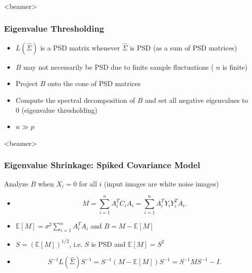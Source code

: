 \documentclass{beamer}
\begin{document}
\begin{frame}<beamer>
\frametitle{Eigenvalue Thresholding}
\begin{itemize}[<+->]
 \item  $L(\hat{\Sigma})$ is a PSD matrix whenever $\hat{\Sigma}$ is PSD (as 
a sum of PSD matrices)
\item  $B$ may not necessarily be PSD due to finite 
sample fluctuations ( $n$ is finite)
\item  Project 
$B$ onto the cone of PSD matrices
\item  Compute the spectral 
decomposition of $B$ and set all negative eigenvalues to 0  (eigenvalue thresholding)
\item $n \gg p$
\end{itemize}
\end{frame}

\begin{frame}<beamer>
\frametitle{Eigenvalue Shrinkage: Spiked Covariance Model}
Analyze $B$ when $X_i=0$ for all $i$ (input images 
are white noise images)


\begin{itemize}
 \item  \begin{equation}
M = \sum_{i=1}^n A_i^T C_i A_i = \sum_{i=1}^n A_i^T Y_i Y_i^T A_i.
\end{equation}
\item  $\mathbb{E}[M] = \sigma^2 \sum_{i=1}^n A_i^T A_i$
and $B = M - \mathbb{E}[M]$
\item  $S = (\mathbb{E}[M])^{1/2}$, i.e. 
$S$ is PSD and $\mathbb{E}[M]=S^2$
\item  \begin{equation}
 S^{-1} L(\hat\Sigma)  S^{-1} = S^{-1}(M - \mathbb{E}[M]) S^{-1} = S^{-1} M S^{-1} - I .
\label{eqn:pop1}
\end{equation}
\end{itemize}
\end{frame}
\end{document}
